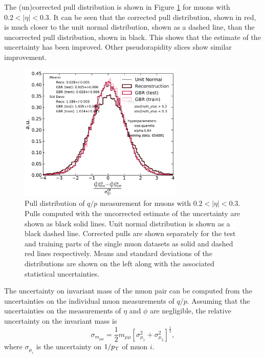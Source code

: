 The (un)corrected pull distribution is shown in Figure \ref{fig:muon:std-single}
for muons with $0.2 < |\eta| < 0.3$.
It can be seen that the corrected pull distribution, shown in red, is much closer
to the unit normal distribution, shown as a dashed line, than the uncorrected
pull distribution, shown in black. This shows that the estimate of the
uncertainty has been improved. Other pseudorapidity slices show similar improvement.
\begin{figure}[h!]
  \centering
  \includegraphics[width=0.7\textwidth]{figures/muons/vader-std-single}
  \caption[VADER4$\mu$ uncertainty correction on the single muon dataset]
  {Pull distribution of $q/p$ measurement for muons with $0.2 < |\eta| < 0.3$.
  Pulls computed with the uncorrected estimate of the uncertainty are shown
  as black solid lines. Unit normal distribution is shown as a black dashed
  line. Corrected pulls are shown separately for the test and training parts
  of the single muon datasets as solid and dashed red lines respectively.
  Means and standard deviations of the distributions are shown on the left
  along with the associated statistical uncertainties.
  }
  \label{fig:muon:std-single}
\end{figure}

The uncertainty on invariant mass of the muon pair can be computed from the 
uncertainties on the individual muon measurements of $q/p$. Assuming that the
uncertainties on the measurements of $\eta$ and $\phi$ are negligible, the
relative uncertainty on the invariant mass is
\begin{equation}
\sigma_{m_{\mu\mu}} = \frac{1}{2}m_{\mu\mu}
\left[ \sigma^2_{\mu_1} + \sigma^2_{\mu_2}\right]^\frac{1}{2},
\end{equation}
where $\sigma_{\mu_i}$ is the uncertainty on $1/p_{\text{T}}$ of muon $i$.

